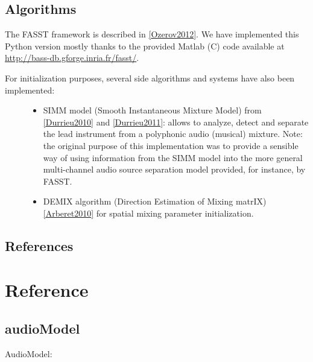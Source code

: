 \documentclass[letterpaper,10pt,english]{sphinxmanual}
\begin{document}
\subsection{Algorithms}
\label{description:algorithms}
The FASST framework is described in {\hyperref[description:ozerov2012]{{[}Ozerov2012{]}}}. We have implemented this Python version mostly thanks to the provided Matlab (C) code available at \href{http://bass-db.gforge.inria.fr/fasst/}{http://bass-db.gforge.inria.fr/fasst/}.
\begin{description}
\item[{For initialization purposes, several side algorithms and systems have also been implemented:}] \leavevmode\begin{itemize}
\item {} 
SIMM model (Smooth Instantaneous Mixture Model) from {\hyperref[description:durrieu2010]{{[}Durrieu2010{]}}} and {\hyperref[description:durrieu2011]{{[}Durrieu2011{]}}}: allows to analyze, detect and separate the lead instrument from a polyphonic audio (musical) mixture. Note: the original purpose of this implementation was to provide a sensible way of using information from the SIMM model into the more general multi-channel audio source separation model provided, for instance, by FASST.

\item {} 
DEMIX algorithm (Direction Estimation of Mixing matrIX) {\hyperref[description:arberet2010]{{[}Arberet2010{]}}} for spatial mixing parameter initialization.

\end{itemize}

\end{description}


\subsection{References}
\label{description:references}

\section{Reference}
\label{reference::doc}\label{reference:reference}

\subsection{audioModel}
\label{reference/audiomodel:audiomodel}\label{reference/audiomodel::doc}\label{reference/audiomodel:module-pyfasst.audioModel}
AudioModel:
\end{document}
